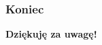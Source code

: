 \documentclass{beamer}
\begin{document}
	\begin{frame}
		\frametitle{Koniec}

		\begin{center}
			\LARGE \textbf{Dziękuję za uwagę!}
		\end{center}
	\end{frame}
\end{document}

